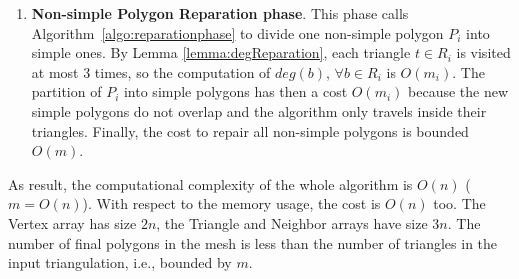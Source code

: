 \documentclass[lineno,pdflatex,sn-mathphys]{sn-jnl}%
\theoremstyle{thmstyleone}%
\theoremstyle{thmstyletwo}%
\theoremstyle{thmstylethree}%
\begin{document}
\begin{enumerate}
    \item {\bf Non-simple Polygon Reparation phase}. This phase calls Algorithm~\ref{algo:reparationphase} to divide one non-simple polygon $P_i$ into simple ones. 
    By Lemma \ref{lemma:degReparation},  each triangle $t \in R_i$ is visited at most $3$ times, so the computation of  $deg(b)$, $\forall b \in R_i$ is  $O(m_i)$. The partition of $P_i$ into simple polygons has then a cost $O(m_i)$ because the new simple polygons  do not overlap and the algorithm only travels inside their triangles. Finally, the cost to repair all non-simple polygons is bounded $O(m)$.
    
    
    
    
\end{enumerate}

\noindent
\noindent
As result, the computational complexity of the whole algorithm is  $O(n)$ ($m = O(n)$).
With respect to the memory usage, the cost is $O(n)$ too. The Vertex array has size $2n$, the Triangle and Neighbor arrays have size $3n$. The number of final polygons in the mesh is less than the number of triangles in the input triangulation, i.e., bounded by $m$.
\end{document}
